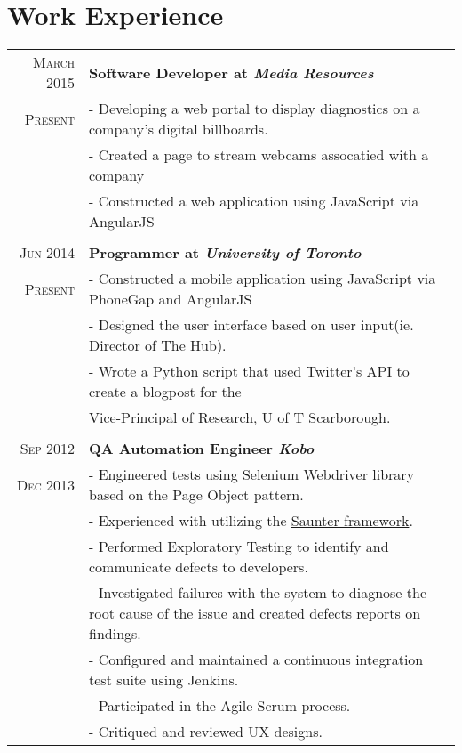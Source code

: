 \documentclass[a4paper, 10pt]{article}
\newcommand{\uhref}[2]{\href{#1}{\color{gray}#2}}
\begin{document}
\section{Work Experience}
\begin{tabular}{r|p{16cm}}
	\textsc{March 2015}
	&	\bf{Software Developer at \emph{Media Resources}}\\
	\textsc{Present}
	& - Developing a web portal to display diagnostics on a company's digital
	billboards.\\
	& - Created a page to stream webcams assocatied with a company\\
	& - Constructed a web application using JavaScript via AngularJS\\
	\\
	\textsc{Jun 2014}
	&	\bf{Programmer at \emph{University of Toronto}}\\
	\textsc{Present}
	& - Constructed a mobile application using JavaScript via PhoneGap and AngularJS\\
	& - Designed the user interface based on user input(ie. Director of \uhref{http://blog.utsc.ut    oronto.ca/thehub/}{The Hub}).\\
	& - Wrote a Python script that used Twitter's API to create a blogpost for
	the\\&	Vice-Principal of Research, U of T Scarborough.\\
	\\
	\textsc{Sep 2012}
	&	\bf{QA Automation Engineer \emph{Kobo}}\\
	\textsc{Dec 2013}
	& - Engineered tests using Selenium Webdriver library based on the Page Object pattern.\\
	& - Experienced with utilizing the \uhref{https://github.com/Element-34/py.saunter}{Saunter framework}.\\
	& - Performed Exploratory Testing to identify and communicate defects to developers.\\
	& - Investigated failures with the system to diagnose the root cause of the issue and created defects reports on findings.\\
	& - Configured and maintained a continuous integration test suite using	Jenkins.\\
	& - Participated in the Agile Scrum process.\\
	& - Critiqued and reviewed UX designs.\\
\end{tabular}\\\\
\end{document}
